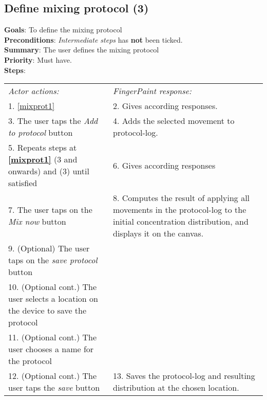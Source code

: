 \begin{appendices}
 \section{Define mixing protocol (3)}
  \label{mixprot3}
  \textbf{Goals}: To define the mixing protocol\\
  \textbf{Preconditions}: \emph{Intermediate steps} has \textbf{not} been ticked.\\
  \textbf{Summary}: The user defines the mixing protocol\\
  \textbf{Priority}: Must have.\\
  \textbf{Steps}: \\
  \begin{tabular}{ p{} p{} }
  	\emph{Actor actions:} & \emph{FingerPaint response:} \\
    1. \ref{mixprot1} & 2. Gives according responses. \\
    3.	The user taps the \emph{Add to protocol} button	& 4.	Adds the selected movement to protocol-log. \\
    5.	Repeats steps at \textbf{\ref{mixprot1}} (3 and onwards) and (3) until satisfied	& 6.	Gives according responses\\
    7.	The user taps on the \emph{Mix now} button	& 8.	Computes the result of applying all movements in the protocol-log to the initial concentration distribution, and displays it on the canvas.\\
    9.	(Optional) The user taps on the \emph{save protocol} button & \\
    10. (Optional cont.) The user selects a location on the device to save the protocol & \\
    11. (Optional cont.) The user chooses a name for the protocol & \\
    12. (Optional cont.) The user taps the \emph{save} button &  13. Saves the protocol-log and resulting distribution at the chosen location. \\
  \end{tabular}
\end{appendices}
